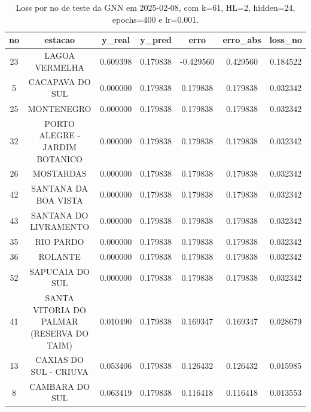 \begin{table}[h]
\centering
\caption{Loss por no de teste da GNN em 2025-02-08, com k=61, HL=2, hidden=24, epochs=400 e lr=0.001.}
\label{tab:gnn_loss_k61_hl2_h24_e400_d20250208}
\begin{tabular}{ccccccc}
\toprule
no & estacao & y\_real & y\_pred & erro & erro\_abs & loss\_no \\
\midrule
23 & LAGOA VERMELHA & 0.609398 & 0.179838 & -0.429560 & 0.429560 & 0.184522 \\
5 & CACAPAVA DO SUL & 0.000000 & 0.179838 & 0.179838 & 0.179838 & 0.032342 \\
25 & MONTENEGRO & 0.000000 & 0.179838 & 0.179838 & 0.179838 & 0.032342 \\
32 & PORTO ALEGRE - JARDIM BOTANICO & 0.000000 & 0.179838 & 0.179838 & 0.179838 & 0.032342 \\
26 & MOSTARDAS & 0.000000 & 0.179838 & 0.179838 & 0.179838 & 0.032342 \\
42 & SANTANA DA BOA VISTA & 0.000000 & 0.179838 & 0.179838 & 0.179838 & 0.032342 \\
43 & SANTANA DO LIVRAMENTO & 0.000000 & 0.179838 & 0.179838 & 0.179838 & 0.032342 \\
35 & RIO PARDO & 0.000000 & 0.179838 & 0.179838 & 0.179838 & 0.032342 \\
36 & ROLANTE & 0.000000 & 0.179838 & 0.179838 & 0.179838 & 0.032342 \\
52 & SAPUCAIA DO SUL & 0.000000 & 0.179838 & 0.179838 & 0.179838 & 0.032342 \\
41 & SANTA VITORIA DO PALMAR (RESERVA DO TAIM) & 0.010490 & 0.179838 & 0.169347 & 0.169347 & 0.028679 \\
13 & CAXIAS DO SUL - CRIUVA & 0.053406 & 0.179838 & 0.126432 & 0.126432 & 0.015985 \\
8 & CAMBARA DO SUL & 0.063419 & 0.179838 & 0.116418 & 0.116418 & 0.013553 \\
\bottomrule
\end{tabular}
\end{table}
